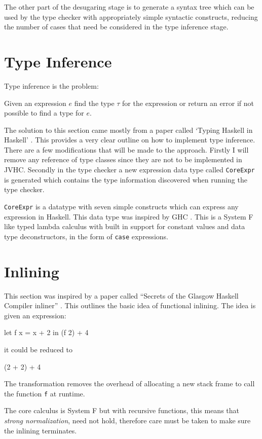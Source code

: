 \documentclass[float=false, crop=false]{standalone}
\begin{document}
The other part of the desugaring stage is to generate a syntax tree which can be used by the type checker
with appropriately simple syntactic constructs, reducing the number of cases that need
be considered in the type inference stage.

\section{Type Inference}

Type inference is the problem:
\begin{displayquote}
Given an expression $e$ find the type $\tau$ for the expression or return an error if not possible to
find a type for $e$.
\end{displayquote}
The solution to this section came mostly from a paper called `Typing Haskell in Haskell' \cite{thih-paper}. 
This provides a very clear outline on how to implement type inference. 
There are a few modifications that will be made to the approach.
Firstly I will remove any reference of type classes since they are not to be implemented in JVHC.
Secondly in the type checker a new expression data type called \texttt{CoreExpr} 
is generated which contains the type information discovered when running the type checker.

\texttt{CoreExpr} is a datatype with seven simple constructs which can express any expression in Haskell.
This data type was inspired by GHC \cite{typedcorelink}. This is a System F like typed lambda calculus with
built in support for constant values and data type deconstructors, in the form of \texttt{case} expressions.

\section{Inlining}

This section was inspired by a paper called ``Secrets of the 
Glasgow Haskell Compiler inliner'' \cite{ghc-inliner}. This outlines the basic idea of functional 
inlining. The idea is given an expression:
\begin{HaskellLst}
let f x = x + 2 in 
  (f 2) + 4
\end{HaskellLst}
it could be reduced to
\begin{HaskellLst}
(2 + 2) + 4
\end{HaskellLst}
The transformation removes the overhead of allocating a new stack frame to call 
the function \texttt{f} at runtime.

The core calculus is System F but with recursive functions, 
this means that \textit{strong normalization}, 
need not hold, therefore care must be taken to make sure the inlining terminates.
\end{document}

